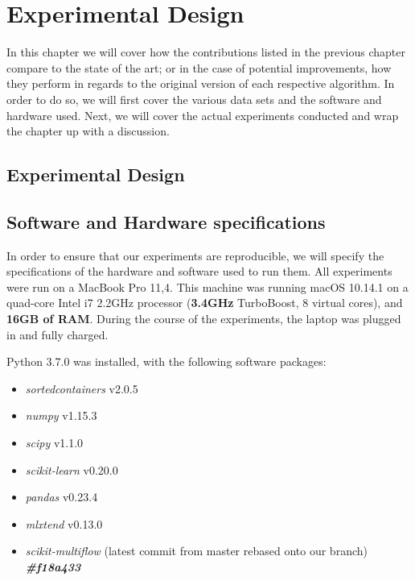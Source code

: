
\chapter{Experimental Design} %

\label{Chapter4} %
In this chapter we will cover how the contributions listed in the previous chapter compare to the state of the art; or in the case of potential improvements, how they perform in regards to the original version of each respective algorithm. In order to do so, we will first cover the various data sets and the software and hardware used. Next, we will cover the actual experiments conducted and wrap the chapter up with a discussion.


\section{Experimental Design}

\section{Software and Hardware specifications}
In order to ensure that our experiments are reproducible, we will specify the specifications of the hardware and software used to run them. All experiments were run on a MacBook Pro 11,4. This machine was running macOS 10.14.1 on a quad-core Intel i7 2.2GHz processor (\textbf{3.4GHz} TurboBoost, 8 virtual cores), and \textbf{16GB of RAM}. During the course of the experiments, the laptop was plugged in and fully charged.

Python 3.7.0 was installed, with the following software packages:
\begin{itemize}
\item \textit{sortedcontainers} v2.0.5
\item \textit{numpy} v1.15.3
\item \textit{scipy} v1.1.0
\item \textit{scikit-learn} v0.20.0
\item \textit{pandas} v0.23.4
\item \textit{mlxtend} v0.13.0
\item \textit{scikit-multiflow} (latest commit from master rebased onto our branch) \textit{\textbf{\#f18a433}}
\end{itemize}

